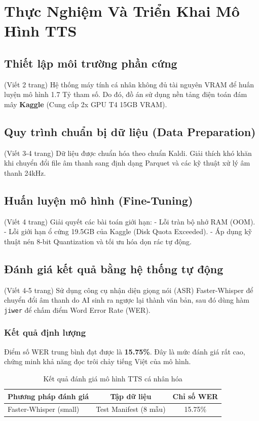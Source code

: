 \documentclass[a4paper,13pt]{report}
\begin{document}
\chapter{Thực Nghiệm Và Triển Khai Mô Hình TTS}

\section{Thiết lập môi trường phần cứng}
(Viết 2 trang)
Hệ thống máy tính cá nhân không đủ tài nguyên VRAM để huấn luyện mô hình 1.7 Tỷ tham số. Do đó, đồ án sử dụng nền tảng điện toán đám mây \textbf{Kaggle} (Cung cấp 2x GPU T4 15GB VRAM).

\section{Quy trình chuẩn bị dữ liệu (Data Preparation)}
(Viết 3-4 trang)
Dữ liệu được chuẩn hóa theo chuẩn Kaldi. Giải thích khó khăn khi chuyển đổi file âm thanh sang định dạng Parquet và các kỹ thuật xử lý âm thanh 24kHz.

\section{Huấn luyện mô hình (Fine-Tuning)}
(Viết 4 trang)
Giải quyết các bài toán giới hạn:
- Lỗi tràn bộ nhớ RAM (OOM).
- Lỗi giới hạn ổ cứng 19.5GB của Kaggle (Disk Quota Exceeded).
- Áp dụng kỹ thuật nén 8-bit Quantization và tối ưu hóa dọn rác tự động.

\section{Đánh giá kết quả bằng hệ thống tự động}
(Viết 4-5 trang)
Sử dụng công cụ nhận diện giọng nói (ASR) Faster-Whisper để chuyển đổi âm thanh do AI sinh ra ngược lại thành văn bản, sau đó dùng hàm \texttt{jiwer} để chấm điểm Word Error Rate (WER).

\subsection{Kết quả định lượng}
Điểm số WER trung bình đạt được là \textbf{15.75\%}. Đây là mức đánh giá rất cao, chứng minh khả năng đọc trôi chảy tiếng Việt của mô hình.

\begin{table}[h!]
    \centering
    \begin{tabular}{@{}lcc@{}}
        \toprule
        \textbf{Phương pháp đánh giá} & \textbf{Tập dữ liệu} & \textbf{Chỉ số WER} \\ \midrule
        Faster-Whisper (small) & Test Manifest (8 mẫu) & 15.75\% \\ \bottomrule
    \end{tabular}
    \caption{Kết quả đánh giá mô hình TTS cá nhân hóa}
\end{table}
\end{document}

